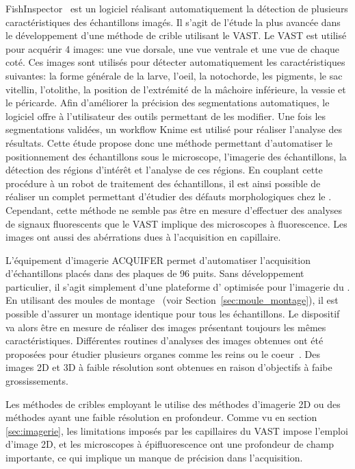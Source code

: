 \documentclass[\main/main.tex]{subfiles}
\begin{document}
FishInspector~\cite{teixid_2019} est un logiciel réalisant automatiquement la détection de plusieurs caractéristiques des échantillons imagés.
%
Il s'agit de l'étude la plus avancée dans le développement d'une méthode de crible utilisant le VAST.
%
Le VAST est utilisé pour acquérir 4 images: une vue dorsale, une vue ventrale et une vue de chaque coté.
%
Ces images sont utilisés pour détecter automatiquement les caractéristiques suivantes:
%
la forme générale de la larve,
l'oeil,
la notochorde,
les pigments,
le sac vitellin,
l'otolithe,
la position de l'extrémité de la mâchoire inférieure,
la vessie et le péricarde.
%
Afin d'améliorer la précision des segmentations automatiques,
le logiciel offre à l'utilisateur des outils permettant de les modifier.
%
Une fois les segmentations validées, un workflow Knime est utilisé pour réaliser l'analyse des résultats.
%
Cette étude propose donc une méthode permettant d'automatiser le positionnement des échantillons sous le microscope, l'imagerie des échantillons, la détection des régions d'intérêt et l'analyse de ces régions.
%
En couplant cette procédure à un robot de traitement des échantillons, il est ainsi possible de réaliser un \hcs{} complet permettant d'étudier des défauts morphologiques chez le \pz{}.
%
Cependant, cette méthode ne semble pas être en mesure d'effectuer des analyses de signaux fluorescents que le VAST implique des microscopes à fluorescence. Les images ont aussi des abérrations dues à l'acquisition en capillaire.

%
L'équipement d'imagerie ACQUIFER permet d'automatiser l'acquisition d'échantillons placés dans des plaques de 96 puits.
%
Sans développement particulier, il s'agit simplement d'une plateforme d'\hti{} optimisée pour l'imagerie du \pz{}.
%
En utilisant des moules de montage~\cite{wittbrodt_2014} (voir Section~\ref{sec:moule_montage}), il est possible d'assurer un montage identique pour tous les échantillons.
%
Le dispositif va alors être en mesure de réaliser des images présentant toujours les mêmes caractéristiques.
%
Différentes routines d'analyses des images obtenues ont été proposées pour étudier plusieurs organes comme les reins ou le coeur~\cite{westhoff_2020, steenbergen_2020, pandey_2019}. Des images 2D et 3D à faible résolution sont obtenues en raison d'objectifs à faibe grossissements.

%
Les méthodes de cribles employant le \pz{} utilise des méthodes d'imagerie 2D ou des méthodes ayant une faible résolution en profondeur.
%
Comme vu en section \ref{sec:imagerie}, les limitations imposés par les capillaires du VAST impose l'emploi d'image 2D, et les microscopes à épifluorescence ont une profondeur de champ importante, ce qui implique un manque de précision dans l'acquisition.
\end{document}
